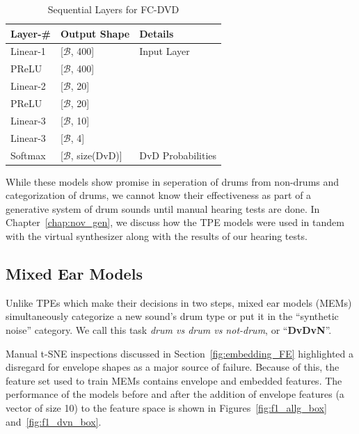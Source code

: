 \documentclass[\main/thesis.tex]{subfiles}
\begin{document}
\begin{center}
    \begin{table}[tbp]
    \centering
    \begin{tabular}{|p{33mm}|p{33mm}|p{50mm}|}
    \hline
    Layer-\# & Output Shape &  Details  \\ \hline
    Linear-1 & [$\mathcal{B}$, 400] &   Input Layer  \\ \hline
    PReLU & [$\mathcal{B}$, 400] &  \\ \hline
    Linear-2 & [$\mathcal{B}$, 20] & \\ \hline
    PReLU & [$\mathcal{B}$, 20] &  \\ \hline 
    Linear-3 & [$\mathcal{B}$, 10] &  \\ \hline %
    Linear-3 & [$\mathcal{B}$, 4] &  \\ \hline 
    Softmax & [$\mathcal{B}$, size(DvD)] &  DvD Probabilities\\ \hline
    \end{tabular}
    \caption{Sequential Layers for FC-DVD}
    \label{tab:dvdfc}
    \end{table}
\end{center}

While these models show promise in seperation of drums from non-drums and categorization of drums, we cannot know their effectiveness as part of a generative system of drum sounds until manual hearing tests are done. In Chapter~\ref{chap:nov_gen}, we discuss how the TPE models were used in tandem with the virtual synthesizer along with the results of our hearing tests. 
\subsection{Mixed Ear Models}
\label{chap3:mixed_ear_models}
Unlike TPEs which make their decisions in two steps, mixed ear models (MEMs) simultaneously categorize a new sound's drum type or put it in the \enquote{synthetic noise} category. We call this task \textit{drum vs drum vs not-drum}, or \enquote{\textbf{DvDvN}}.

Manual t-SNE inspections discussed in Section~\ref{fig:embedding_FE} highlighted a disregard for envelope shapes as a major source of failure. Because of this, the feature set used to train MEMs contains envelope and embedded features. The performance of the models before and after the addition of envelope features (a vector of size 10) to the feature space is shown in Figures~\ref{fig:f1_allg_box} and~\ref{fig:f1_dvn_box}.
\end{document}
